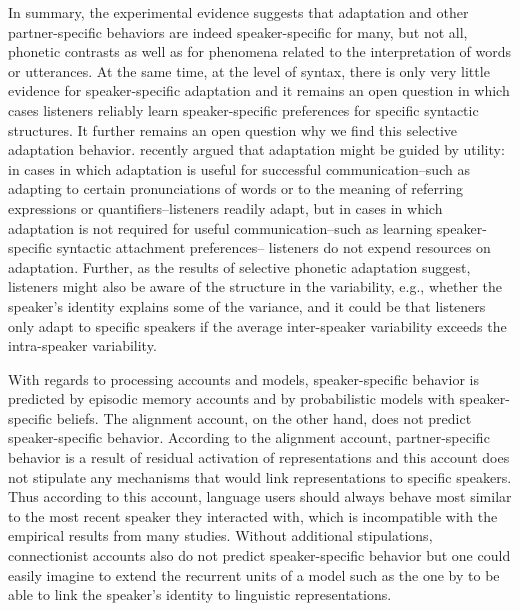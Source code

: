 In summary, the experimental evidence suggests that adaptation and other partner-specific behaviors are indeed speaker-specific for many, but not all, phonetic contrasts as
well as for phenomena related to the interpretation of words or utterances. At the same time, at the level of syntax, there is only very little evidence for speaker-specific
adaptation and it remains an open question  in which cases listeners reliably learn speaker-specific preferences for specific syntactic structures. 
It further remains an open question why we find this selective adaptation behavior. \cite{OstrandFerreira2019} recently
argued that adaptation might be guided by utility: in cases in which adaptation is useful for successful communication--such as adapting to certain pronunciations of words or to the meaning
of referring expressions or quantifiers--listeners readily adapt, but in cases in which adaptation is not required for useful communication--such as learning speaker-specific syntactic attachment preferences--
listeners do not expend resources on adaptation. Further, as the results of selective phonetic adaptation suggest, listeners might also be aware of the structure in the variability, e.g., whether the speaker's
identity explains some of the variance, and it could be that listeners only adapt to specific speakers if the average inter-speaker variability exceeds the intra-speaker variability.

With regards to processing accounts and models, speaker-specific behavior is predicted by episodic memory accounts and by probabilistic models with speaker-specific beliefs. 
The alignment account, on the other hand, does not predict speaker-specific behavior. According to the alignment account, partner-specific behavior is a result of residual activation of representations
and this account does not stipulate any mechanisms that would link representations to specific speakers. Thus according to this account, language users should always behave most similar to 
the most recent speaker they interacted with, which is incompatible with the empirical results from many studies. Without additional stipulations, connectionist accounts also do not 
predict speaker-specific behavior but one could easily imagine to extend the recurrent units of a model such as the one by \cite{Cheng2006} to be able to link the speaker's identity to
linguistic representations.

